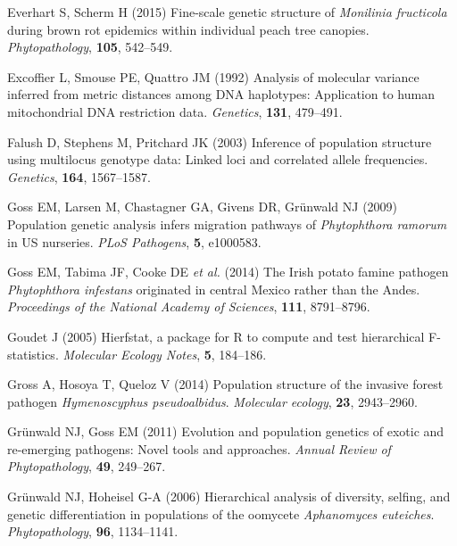 \documentclass[double,12pt]{beavtex}
\begin{document}
  \hypertarget{ref-everhart2014fine}{}
  Everhart S, Scherm H (2015) Fine-scale genetic structure of
  \emph{Monilinia fructicola} during brown rot epidemics within individual
  peach tree canopies. \emph{Phytopathology}, \textbf{105}, 542--549.
  
  \hypertarget{ref-excoffier1992analysis}{}
  Excoffier L, Smouse PE, Quattro JM (1992) Analysis of molecular variance
  inferred from metric distances among DNA haplotypes: Application to
  human mitochondrial DNA restriction data. \emph{Genetics}, \textbf{131},
  479--491.
  
  \hypertarget{ref-Falush01082003}{}
  Falush D, Stephens M, Pritchard JK (2003) Inference of population
  structure using multilocus genotype data: Linked loci and correlated
  allele frequencies. \emph{Genetics}, \textbf{164}, 1567--1587.
  
  \hypertarget{ref-goss2009population}{}
  Goss EM, Larsen M, Chastagner GA, Givens DR, Grünwald NJ (2009)
  Population genetic analysis infers migration pathways of
  \emph{Phytophthora ramorum} in US nurseries. \emph{PLoS Pathogens},
  \textbf{5}, e1000583.
  
  \hypertarget{ref-goss2014irish}{}
  Goss EM, Tabima JF, Cooke DE \emph{et al.} (2014) The Irish potato
  famine pathogen \emph{Phytophthora infestans} originated in central
  Mexico rather than the Andes. \emph{Proceedings of the National Academy
  of Sciences}, \textbf{111}, 8791--8796.
  
  \hypertarget{ref-goudet2005hierfstat}{}
  Goudet J (2005) Hierfstat, a package for R to compute and test
  hierarchical F-statistics. \emph{Molecular Ecology Notes}, \textbf{5},
  184--186.
  
  \hypertarget{ref-gross2014population}{}
  Gross A, Hosoya T, Queloz V (2014) Population structure of the invasive
  forest pathogen \emph{Hymenoscyphus pseudoalbidus}. \emph{Molecular
  ecology}, \textbf{23}, 2943--2960.
  
  \hypertarget{ref-grunwald2011evolution}{}
  Grünwald NJ, Goss EM (2011) Evolution and population genetics of exotic
  and re-emerging pathogens: Novel tools and approaches. \emph{Annual
  Review of Phytopathology}, \textbf{49}, 249--267.
  
  \hypertarget{ref-grunwald2006hierarchical}{}
  Grünwald NJ, Hoheisel G-A (2006) Hierarchical analysis of diversity,
  selfing, and genetic differentiation in populations of the oomycete
  \emph{Aphanomyces euteiches}. \emph{Phytopathology}, \textbf{96},
  1134--1141.
  
\end{document}

